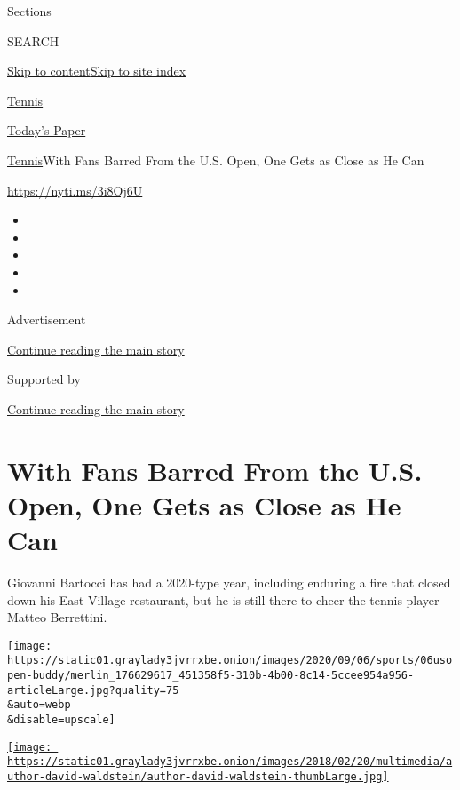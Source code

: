 Sections

SEARCH

\protect\hyperlink{site-content}{Skip to
content}\protect\hyperlink{site-index}{Skip to site index}

\href{https://www.nytimes3xbfgragh.onion/section/sports/tennis}{Tennis}

\href{https://myaccount.nytimes3xbfgragh.onion/auth/login?response_type=cookie\&client_id=vi}{}

\href{https://www.nytimes3xbfgragh.onion/section/todayspaper}{Today's
Paper}

\href{/section/sports/tennis}{Tennis}\textbar{}With Fans Barred From the
U.S. Open, One Gets as Close as He Can

\url{https://nyti.ms/3i8Oj6U}

\begin{itemize}
\item
\item
\item
\item
\item
\end{itemize}

Advertisement

\protect\hyperlink{after-top}{Continue reading the main story}

Supported by

\protect\hyperlink{after-sponsor}{Continue reading the main story}

\hypertarget{with-fans-barred-from-the-us-open-one-gets-as-close-as-he-can}{%
\section{With Fans Barred From the U.S. Open, One Gets as Close as He
Can}\label{with-fans-barred-from-the-us-open-one-gets-as-close-as-he-can}}

Giovanni Bartocci has had a 2020-type year, including enduring a fire
that closed down his East Village restaurant, but he is still there to
cheer the tennis player Matteo Berrettini.

\texttt{[image: https://static01.graylady3jvrrxbe.onion/images/2020/09/06/sports/06usopen-buddy/merlin\_176629617\_451358f5-310b-4b00-8c14-5ccee954a956-articleLarge.jpg?quality=75\\\&auto=webp\\\&disable=upscale]}

\href{https://www.nytimes3xbfgragh.onion/by/david-waldstein}{\texttt{[image: https://static01.graylady3jvrrxbe.onion/images/2018/02/20/multimedia/author-david-waldstein/author-david-waldstein-thumbLarge.jpg]}}

